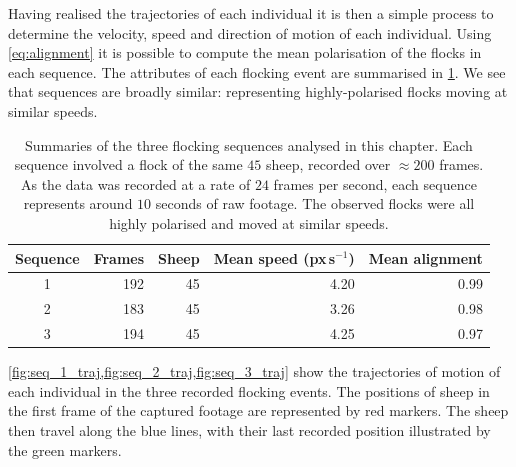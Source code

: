 Having realised the trajectories of each individual it is then a simple process
to determine the velocity, speed and direction of motion of each individual.
Using \cref{eq:alignment} it is possible to compute the mean polarisation of
the flocks in each sequence. The attributes of each flocking event are
summarised in \cref{tab:data_summary}. We see that sequences are broadly
similar: representing highly-polarised flocks moving at similar speeds.

\begin{table}[tbp]
\begin{tabular}{@{}crrrr@{}}
\toprule
Sequence & Frames & Sheep & Mean speed (px\,s$^{-1}$) & Mean alignment \\
\midrule
1 &    192 &     45 &      4.20 &          0.99 \\
2 &    183 &     45 &      3.26 &          0.98 \\
3 &    194 &     45 &      4.25 &          0.97 \\
\bottomrule
\end{tabular}
\caption{Summaries of the three flocking sequences analysed in this chapter.
  Each sequence involved a flock of the same $45$ sheep, recorded over
  $\approx200$ frames. As the data was recorded at a rate of $24$ frames per
  second, each sequence represents around $10$ seconds of raw footage. The
  observed flocks were all highly polarised and moved at similar speeds.}
\label{tab:data_summary}
\end{table}

\cref{fig:seq_1_traj,fig:seq_2_traj,fig:seq_3_traj} show the trajectories of
motion of each individual in the three recorded flocking events. The positions
of sheep in the first frame of the captured footage are represented by red
markers. The sheep then travel along the blue lines, with their last recorded
position illustrated by the green markers.

